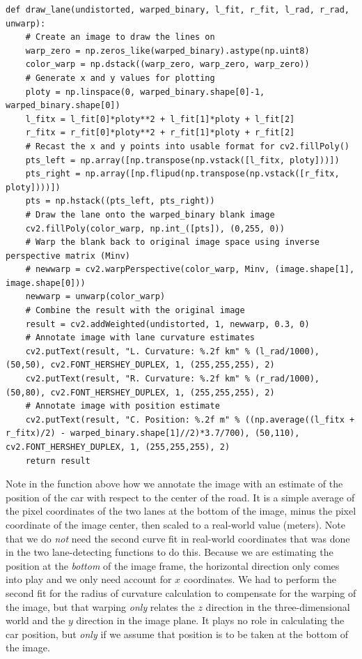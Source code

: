 \documentclass[11pt]{article}
\begin{document}
\begin{verbatim}
def draw_lane(undistorted, warped_binary, l_fit, r_fit, l_rad, r_rad, unwarp):
    # Create an image to draw the lines on
    warp_zero = np.zeros_like(warped_binary).astype(np.uint8)
    color_warp = np.dstack((warp_zero, warp_zero, warp_zero))
    # Generate x and y values for plotting
    ploty = np.linspace(0, warped_binary.shape[0]-1, warped_binary.shape[0])
    l_fitx = l_fit[0]*ploty**2 + l_fit[1]*ploty + l_fit[2]
    r_fitx = r_fit[0]*ploty**2 + r_fit[1]*ploty + r_fit[2]
    # Recast the x and y points into usable format for cv2.fillPoly()
    pts_left = np.array([np.transpose(np.vstack([l_fitx, ploty]))])
    pts_right = np.array([np.flipud(np.transpose(np.vstack([r_fitx, ploty])))])
    pts = np.hstack((pts_left, pts_right))
    # Draw the lane onto the warped_binary blank image
    cv2.fillPoly(color_warp, np.int_([pts]), (0,255, 0))
    # Warp the blank back to original image space using inverse perspective matrix (Minv)
    # newwarp = cv2.warpPerspective(color_warp, Minv, (image.shape[1], image.shape[0])) 
    newwarp = unwarp(color_warp)
    # Combine the result with the original image
    result = cv2.addWeighted(undistorted, 1, newwarp, 0.3, 0)
    # Annotate image with lane curvature estimates
    cv2.putText(result, "L. Curvature: %.2f km" % (l_rad/1000), (50,50), cv2.FONT_HERSHEY_DUPLEX, 1, (255,255,255), 2)
    cv2.putText(result, "R. Curvature: %.2f km" % (r_rad/1000), (50,80), cv2.FONT_HERSHEY_DUPLEX, 1, (255,255,255), 2)
    # Annotate image with position estimate
    cv2.putText(result, "C. Position: %.2f m" % ((np.average((l_fitx + r_fitx)/2) - warped_binary.shape[1]//2)*3.7/700), (50,110), cv2.FONT_HERSHEY_DUPLEX, 1, (255,255,255), 2)
    return result
\end{verbatim}

Note in the function above how we annotate the image with an
estimate of the position of the car with respect to the center
of the road.  It is a simple average of the pixel coordinates of
the two lanes at the bottom of the image, minus the pixel
coordinate of the image center, then scaled to a real-world
value (meters).  Note that we do \emph{not} need the second curve fit
in real-world coordinates that was done in the two
lane-detecting functions to do this.  Because we are estimating
the position at the \emph{bottom} of the image frame, the horizontal
direction only comes into play and we only need account for $x$
coordinates.  We had to perform the second fit for the radius of
curvature calculation to compensate for the warping of the
image, but that warping \emph{only} relates the $z$ direction in the
three-dimensional world and the $y$ direction in the image
plane.  It plays no role in calculating the car position, but
\emph{only} if we assume that position is to be taken at the bottom
of the image.
\end{document}
